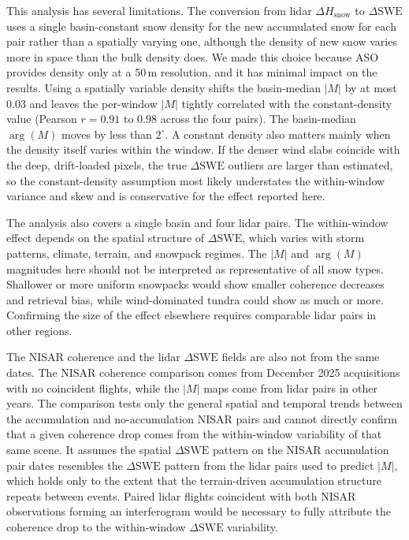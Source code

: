 \documentclass[tc, manuscript]{copernicus}
\begin{document}
This analysis has several limitations. The conversion from lidar $\Delta H_{\mathrm{snow}}$ to $\Delta\mathrm{SWE}$ uses a single basin-constant snow density for the new accumulated snow for each pair rather than a spatially varying one, although the density of new snow varies more in space than the bulk density does. We made this choice because ASO provides density only at a 50\,\unit{m} resolution, and it has minimal impact on the results. Using a spatially variable density shifts the basin-median $|M|$ by at most 0.03 and leaves the per-window $|M|$ tightly correlated with the constant-density value (Pearson $r = 0.91$ to $0.98$ across the four pairs). The basin-median $\arg(M)$ moves by less than $2^\circ$. A constant density also matters mainly when the density itself varies within the window. If the denser wind slabs coincide with the deep, drift-loaded pixels, the true $\Delta\mathrm{SWE}$ outliers are larger than estimated, so the constant-density assumption most likely understates the within-window variance and skew and is conservative for the effect reported here.

The analysis also covers a single basin and four lidar pairs. The within-window effect depends on the spatial structure of $\Delta\mathrm{SWE}$, which varies with storm patterns, climate, terrain, and snowpack regimes. The $|M|$ and $\arg(M)$ magnitudes here should not be interpreted as representative of all snow types. Shallower or more uniform snowpacks would show smaller coherence decreases and retrieval bias, while wind-dominated tundra could show as much or more. Confirming the size of the effect elsewhere requires comparable lidar pairs in other regions.

The NISAR coherence and the lidar $\Delta\mathrm{SWE}$ fields are also not from the same dates. The NISAR coherence comparison comes from December 2025 acquisitions with no coincident flights, while the $|M|$ maps come from lidar pairs in other years. The comparison tests only the general spatial and temporal trends between the accumulation and no-accumulation NISAR pairs and cannot directly confirm that a given coherence drop comes from the within-window variability of that same scene. It assumes the spatial $\Delta\mathrm{SWE}$ pattern on the NISAR accumulation pair dates resembles the $\Delta\mathrm{SWE}$ pattern from the lidar pairs used to predict $|M|$, which holds only to the extent that the terrain-driven accumulation structure repeats between events. Paired lidar flights coincident with both NISAR observations forming an interferogram would be necessary to fully attribute the coherence drop to the within-window $\Delta\mathrm{SWE}$ variability.
\end{document}
